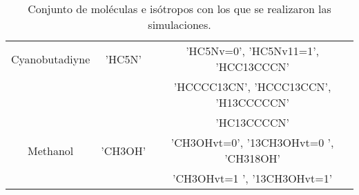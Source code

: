 \begin {table}[H]
\begin{center}
\begin{tabular}{|c|c|c|}
			
		\hline	Cyanobutadiyne & 'HC5N' & 'HC5Nv=0', 'HC5Nv11=1', 'HCC13CCCN'\\
							   &        & 'HCCCC13CN', 'HCCC13CCN', 'H13CCCCCN'\\
							   &        & 'HC13CCCCN' \\
			
		\hline	Methanol & 'CH3OH' & 'CH3OHvt=0', '13CH3OHvt=0 ', 'CH318OH' \\
						 &      & 'CH3OHvt=1 ', '13CH3OHvt=1'\\

		\hline 
	\end{tabular}
	\caption {Conjunto de moléculas e isótropos con los que se realizaron las simulaciones.}
\end{center}
\end{table}
